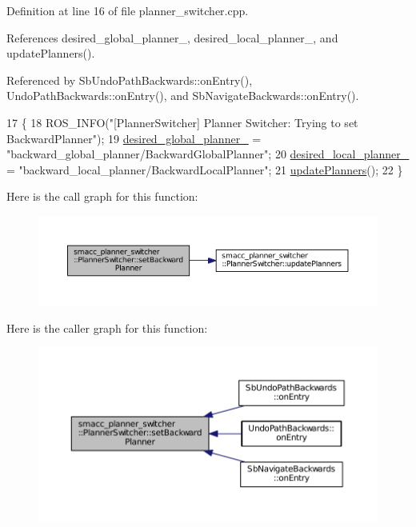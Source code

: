 Definition at line 16 of file planner\+\_\+switcher.\+cpp.



References desired\+\_\+global\+\_\+planner\+\_\+, desired\+\_\+local\+\_\+planner\+\_\+, and update\+Planners().



Referenced by Sb\+Undo\+Path\+Backwards\+::on\+Entry(), Undo\+Path\+Backwards\+::on\+Entry(), and Sb\+Navigate\+Backwards\+::on\+Entry().


\begin{DoxyCode}
17 \{
18   ROS\_INFO(\textcolor{stringliteral}{"[PlannerSwitcher] Planner Switcher: Trying to set BackwardPlanner"});
19   \hyperlink{classsmacc__planner__switcher_1_1PlannerSwitcher_aed229df648a0903e3cdf77682220efb5}{desired\_global\_planner\_} = \textcolor{stringliteral}{"backward\_global\_planner/BackwardGlobalPlanner"};
20   \hyperlink{classsmacc__planner__switcher_1_1PlannerSwitcher_aecc5958653ed39dd7611783043d23345}{desired\_local\_planner\_} = \textcolor{stringliteral}{"backward\_local\_planner/BackwardLocalPlanner"};
21   \hyperlink{classsmacc__planner__switcher_1_1PlannerSwitcher_ae45c57b459f1eb9ee4cc3c6dc6dc0995}{updatePlanners}();
22 \}
\end{DoxyCode}


Here is the call graph for this function\+:
\nopagebreak
\begin{figure}[H]
\begin{center}
\leavevmode
\includegraphics[width=350pt]{classsmacc__planner__switcher_1_1PlannerSwitcher_a848558a4309a42c546ab87e65722da2f_cgraph}
\end{center}
\end{figure}




Here is the caller graph for this function\+:
\nopagebreak
\begin{figure}[H]
\begin{center}
\leavevmode
\includegraphics[width=350pt]{classsmacc__planner__switcher_1_1PlannerSwitcher_a848558a4309a42c546ab87e65722da2f_icgraph}
\end{center}
\end{figure}


